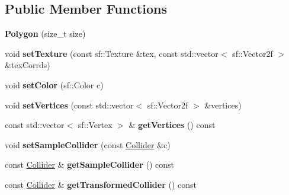 \subsection*{Public Member Functions}
\begin{DoxyCompactItemize}
\item 
{\bfseries Polygon} (size\+\_\+t size)\hypertarget{classsfgf_1_1Polygon_ac0e3dc7fc8690145aa007fcfed22ba8c}{}\label{classsfgf_1_1Polygon_ac0e3dc7fc8690145aa007fcfed22ba8c}

\item 
void {\bfseries set\+Texture} (const sf\+::\+Texture \&tex, const std\+::vector$<$ sf\+::\+Vector2f $>$ \&tex\+Corrds)\hypertarget{classsfgf_1_1Polygon_abd78111e7f26e4750c67cf29ac56687f}{}\label{classsfgf_1_1Polygon_abd78111e7f26e4750c67cf29ac56687f}

\item 
void {\bfseries set\+Color} (sf\+::\+Color c)\hypertarget{classsfgf_1_1Polygon_a8386919ff578dbdafcfce0802f9b4ee9}{}\label{classsfgf_1_1Polygon_a8386919ff578dbdafcfce0802f9b4ee9}

\item 
void {\bfseries set\+Vertices} (const std\+::vector$<$ sf\+::\+Vector2f $>$ \&vertices)\hypertarget{classsfgf_1_1Polygon_ac2fd09fef44ed0af81a47b773a7a4de9}{}\label{classsfgf_1_1Polygon_ac2fd09fef44ed0af81a47b773a7a4de9}

\item 
const std\+::vector$<$ sf\+::\+Vertex $>$ \& {\bfseries get\+Vertices} () const \hypertarget{classsfgf_1_1Polygon_a7bee1deaa314b19f446651b556dec69c}{}\label{classsfgf_1_1Polygon_a7bee1deaa314b19f446651b556dec69c}

\item 
void {\bfseries set\+Sample\+Collider} (const \hyperlink{classsfgf_1_1Collider}{Collider} \&c)\hypertarget{classsfgf_1_1Polygon_aa44ecf16c2fa708766d94552aaceff8e}{}\label{classsfgf_1_1Polygon_aa44ecf16c2fa708766d94552aaceff8e}

\item 
const \hyperlink{classsfgf_1_1Collider}{Collider} \& {\bfseries get\+Sample\+Collider} () const \hypertarget{classsfgf_1_1Polygon_a20c269377502a72558c55d2cb8530189}{}\label{classsfgf_1_1Polygon_a20c269377502a72558c55d2cb8530189}

\item 
const \hyperlink{classsfgf_1_1Collider}{Collider} \& {\bfseries get\+Transformed\+Collider} () const \hypertarget{classsfgf_1_1Polygon_ab8edf97fc02407d2ea5548e99a8110f8}{}\label{classsfgf_1_1Polygon_ab8edf97fc02407d2ea5548e99a8110f8}


\end{DoxyCompactItemize}
